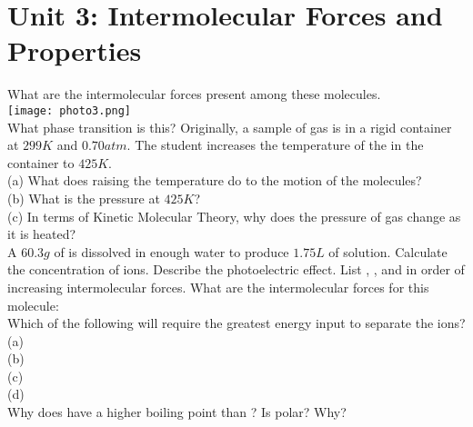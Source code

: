 \documentclass[../main.tex]{subfiles}
\begin{document}
\section{Unit 3: Intermolecular Forces and Properties}
\ProblemSet
What are the intermolecular forces present among these molecules. \\ 
\ProblemSet
\texttt{[image: photo3.png]} \\
What phase transition is this?
\ProblemSet
Originally, a sample of gas is in a rigid container at \(299K\) and \(0.70 atm\). The student increases the temperature of the  in the container to \(425K\).\\
(a) What does raising the temperature do to the motion of the molecules?\\
(b) What is the pressure at \(425K\)?\\
(c) In terms of Kinetic Molecular Theory, why does the pressure of gas change as it is heated? \\
\ProblemSet
A \(60.3g\) of  is dissolved in enough water to produce \(1.75L\) of solution. Calculate the concentration of  ions. 
\ProblemSet
Describe the photoelectric effect. 
\ProblemSet
List , , and  in order of increasing intermolecular forces. 
\ProblemSet
What are the intermolecular forces for this molecule:\\
\ProblemSet
Which of the following will require the greatest energy input to separate the ions?\\
(a) \\
(b) \\
(c) \\
(d) \\
\ProblemSet
Why does  have a higher boiling point than ?
\ProblemSet
Is  polar? Why?
\end{document}
